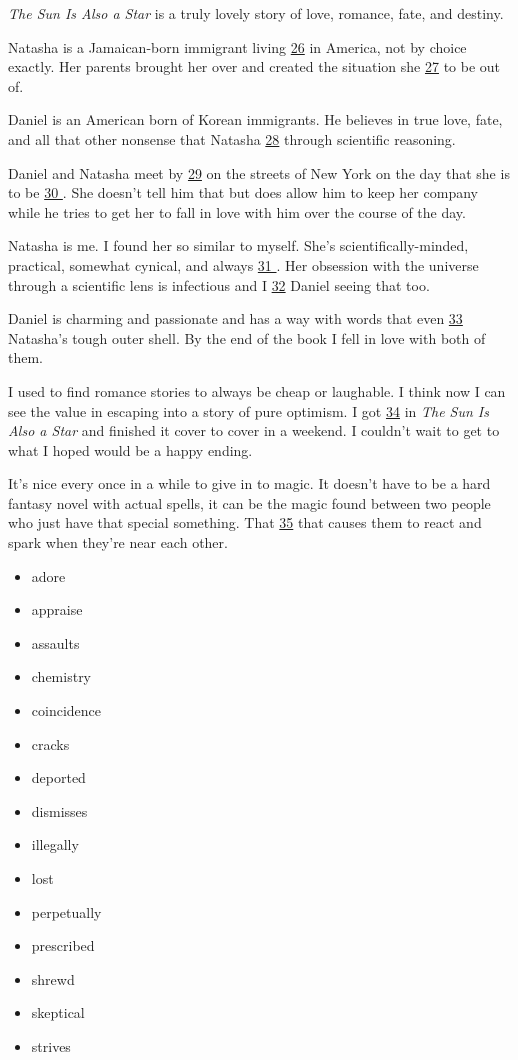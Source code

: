 \documentclass[UTF8,11pt]{ctexart}
\begin{document}
\textit{The Sun Is Also a Star} is a truly lovely story of love, romance, fate, and destiny.


Natasha is a Jamaican-born immigrant living \uline{26} in America, not by choice exactly. Her parents brought her over and created the situation she \uline{27} to be out of.


Daniel is an American born of Korean immigrants. He believes in true love, fate, and all that other nonsense that Natasha \uline{28} through scientific reasoning.


Daniel and Natasha meet by \uline{29} on the streets of New York on the day that she is to be \uline{30 }. She doesn’t tell him that but does allow him to keep her company while he tries to get her to fall in love with him over the course of the day.


Natasha is me. I found her so similar to myself. She’s scientifically-minded, practical, somewhat cynical, and always \uline{31 }. Her obsession with the universe through a scientific lens is infectious and I \uline{32} Daniel seeing that too.


Daniel is charming and passionate and has a way with words that even \uline{33} Natasha’s tough outer shell. By the end of the book I fell in love with both of them.


I used to find romance stories to always be cheap or laughable. I think now I can see the value in escaping into a story of pure optimism. I got \uline{34} in \textit{The Sun Is Also a Star} and finished it cover to cover in a weekend. I couldn’t wait to get to what I hoped would be a happy ending.


It’s nice every once in a while to give in to magic. It doesn’t have to be a hard fantasy novel with actual spells, it can be the magic found between two people who just have that special something. That \uline{35} that causes them to react and spark when they’re near each other.


\begin{itemize}[leftmargin=2em,itemsep=.2em,topsep=.4em]\item[A.] adore
\item[B.] appraise
\item[C.] assaults
\item[D.] chemistry
\item[E.] coincidence
\item[F.] cracks
\item[G.] deported
\item[H.] dismisses
\item[I.] illegally
\item[J.] lost
\item[K.] perpetually
\item[L.] prescribed
\item[M.] shrewd
\item[N.] skeptical
\item[O.] strives
\end{itemize}
\end{document}
